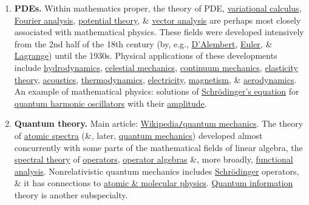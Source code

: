 \documentclass{article}
\begin{document}
\begin{enumerate}
	\item {\bf PDEs.} Within mathematics proper, the theory of PDE, \href{https://en.wikipedia.org/wiki/Variational_calculus}{variational calculus}, \href{https://en.wikipedia.org/wiki/Fourier_analysis}{Fourier analysis}, \href{https://en.wikipedia.org/wiki/Potential_theory}{potential theory}, \& \href{https://en.wikipedia.org/wiki/Vector_analysis}{vector analysis} are perhaps most closely associated with mathematical physics. These fields were developed intensively from the 2nd half of the 18th century (by, e.g., \href{https://en.wikipedia.org/wiki/Jean_le_Rond_d%27Alembert}{\sc D'Alembert}, \href{https://en.wikipedia.org/wiki/Leonhard_Euler}{\sc Euler}, \& \href{https://en.wikipedia.org/wiki/Joseph-Louis_Lagrange}{\sc Lagrange}) until the 1930s. Physical applications of these developments include \href{https://en.wikipedia.org/wiki/Hydrodynamics}{hydrodynamics}, \href{https://en.wikipedia.org/wiki/Celestial_mechanics}{celestial mechanics}, \href{https://en.wikipedia.org/wiki/Continuum_mechanics}{continuum mechanics}, \href{https://en.wikipedia.org/wiki/Elasticity_theory}{elasticity theory}, \href{https://en.wikipedia.org/wiki/Acoustics}{acoustics}, \href{https://en.wikipedia.org/wiki/Thermodynamics}{thermodynamics}, \href{https://en.wikipedia.org/wiki/Electricity}{electricity}, \href{https://en.wikipedia.org/wiki/Magnetism}{magnetism}, \& \href{https://en.wikipedia.org/wiki/Aerodynamics}{aerodynamics}. {\sf An example of mathematical physics: solutions of \href{https://en.wikipedia.org/wiki/Schr%C3%B6dinger%27s_equation}{Schr\"odinger's equation} for \href{https://en.wikipedia.org/wiki/Quantum_harmonic_oscillator}{quantum harmonic oscillators} with their \href{https://en.wikipedia.org/wiki/Probability_amplitude}{amplitude}.}
	\item {\bf Quantum theory.} Main article: \href{https://en.wikipedia.org/wiki/Quantum_mechanics}{Wikipedia{\tt/}quantum mechanics}. The theory of \href{https://en.wikipedia.org/wiki/Atomic_spectra}{atomic spectra} (\&, later, \href{https://en.wikipedia.org/wiki/Quantum_mechanics}{quantum mechanics}) developed almost concurrently with some parts of the mathematical fields of linear algebra, the \href{https://en.wikipedia.org/wiki/Spectral_theory}{spectral theory} of \href{https://en.wikipedia.org/wiki/Operator_(mathematics)}{operators}, \href{https://en.wikipedia.org/wiki/Operator_algebra}{operator algebras} \&, more broadly, \href{https://en.wikipedia.org/wiki/Functional_analysis}{functional analysis}. Nonrelativistic quantum mechanics includes \href{https://en.wikipedia.org/wiki/Schr%C3%B6dinger}{Schr\"odinger} operators, \& it has connections to \href{https://en.wikipedia.org/wiki/Atomic,_molecular,_and_optical_physics}{atomic \& molecular physics}. \href{https://en.wikipedia.org/wiki/Quantum_information}{Quantum information} theory is another subspecialty.

\end{enumerate}
\end{document}
